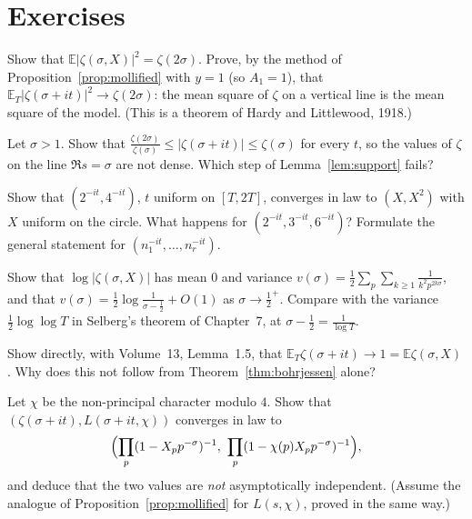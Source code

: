\section{Exercises}

\begin{exercise}[$\star$]\label{ex:meansquarezeta}
Show that $\mathbb E|\zeta(\sigma,X)|^2=\zeta(2\sigma)$. Prove, by the method of Proposition~\ref{prop:mollified} with $y=1$ (so $A_1=1$), that $\mathbb E_T|\zeta(\sigma+it)|^2\to\zeta(2\sigma)$: the mean square of $\zeta$ on a vertical line is the mean square of the model. (This is a theorem of Hardy and Littlewood, 1918.)
\end{exercise}

\begin{exercise}[$\star$]\label{ex:sigmabig}
Let $\sigma>1$. Show that $\frac{\zeta(2\sigma)}{\zeta(\sigma)}\le|\zeta(\sigma+it)|\le\zeta(\sigma)$ for every $t$, so the values of $\zeta$ on the line $\Re s=\sigma$ are not dense. Which step of Lemma~\ref{lem:support} fails?
\end{exercise}

\begin{exercise}[$\star\star$]\label{ex:kwfail}
Show that $(2^{-it},4^{-it})$, $t$ uniform on $[T,2T]$, converges in law to $(X,X^2)$ with $X$ uniform on the circle. What happens for $(2^{-it},3^{-it},6^{-it})$? Formulate the general statement for $(n_1^{-it},\dots,n_r^{-it})$.
\end{exercise}

\begin{exercise}[$\star\star$]\label{ex:varbj}
Show that $\log|\zeta(\sigma,X)|$ has mean $0$ and variance $v(\sigma)=\frac12\sum_p\sum_{k\ge1}\frac1{k^2p^{2k\sigma}}$, and that $v(\sigma)=\frac12\log\frac1{\sigma-\frac12}+O(1)$ as $\sigma\to\frac12^+$. Compare with the variance $\frac12\log\log T$ in Selberg's theorem of Chapter~7, at $\sigma-\frac12=\frac1{\log T}$.
\end{exercise}

\begin{exercise}[$\star\star$]\label{ex:meanzeta}
Show directly, with Volume~13, Lemma~1.5, that $\mathbb E_T\zeta(\sigma+it)\to1=\mathbb E\zeta(\sigma,X)$. Why does this not follow from Theorem~\ref{thm:bohrjessen} alone?
\end{exercise}

\begin{exercise}[$\star\star\star$]\label{ex:jointbj}
Let $\chi$ be the non-principal character modulo $4$. Show that $(\zeta(\sigma+it),L(\sigma+it,\chi))$ converges in law to
\[
\Bigl(\prod_p(1-X_pp^{-\sigma})^{-1},\ \prod_p(1-\chi(p)X_pp^{-\sigma})^{-1}\Bigr),
\]
and deduce that the two values are \emph{not} asymptotically independent. (Assume the analogue of Proposition~\ref{prop:mollified} for $L(s,\chi)$, proved in the same way.)
\end{exercise}

